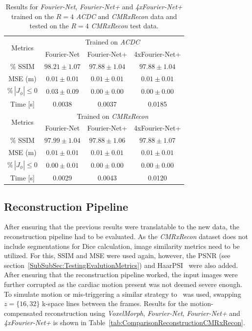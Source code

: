 \documentclass[english,version-2022-01]{uzl-thesis} %
\begin{document}
\begin{table}[H] %
	\centering
	\caption{Results for \emph{Fourier-Net}, \emph{Fourier-Net+} and \emph{4xFourier-Net+} trained on the $R=4$ \emph{ACDC} and \emph{CMRxRecon} data and tested on the $R=4$ \emph{CMRxRecon} test data.}
	\label{tab:DomainTranslation_ACDC_CMRxRecon}
	\begin{tabular}{c c c c} %
		\toprule
		\multirow{2}{*}{Metrics} & \multicolumn{3}{c}{Trained on \emph{ACDC}} \\
		\cline{2-4} 
		 & Fourier-Net & Fourier-Net+ & 4xFourier-Net+\\	
		\midrule
		$\%$ SSIM & $98.21 \pm 1.07$ & $97.88 \pm 1.04$ & $97.88 \pm 1.04$\\
		MSE (m) & $0.01 \pm 0.01$ & $0.01 \pm 0.01$ & $0.01 \pm 0.01$ \\
		$\% \, |J_{\phi}|\leq0$ & $0.03 \pm 0.09$ & $0.00 \pm 0.00$ & $0.00 \pm 0.00$ \\
		Time [s] 	  & 0.0038 & 0.0037 & 0.0185  \\
		\midrule
		\multirow{2}{*}{Metrics} & \multicolumn{3}{c}{Trained on \emph{CMRxRecon}} \\
		\cline{2-4} 
		 & Fourier-Net & Fourier-Net+ & 4xFourier-Net+\\		
		\midrule
		$\%$ SSIM & $97.99 \pm 1.04$ & $97.88 \pm 1.06$ & $97.88 \pm 1.07$\\
		MSE (m) & $0.01 \pm 0.01$ & $0.01 \pm 0.01$ & $0.01 \pm 0.01$ \\
		$\% \, |J_{\phi}|\leq0$ & $0.00 \pm 0.01$ & $0.00 \pm 0.00$ & $0.00 \pm 0.00$ \\
		Time [s] 	  & 0.0029 & 0.0043 & 0.0120  \\
		\bottomrule
	\end{tabular}	
\end{table}

\subsection{Reconstruction Pipeline} \label{SubSec:ResultsReconstructionPipeline}
After ensuring that the previous results were translatable to the new data, the reconstruction pipeline had to be evaluated. As the \emph{CMRxRecon} dataset does not include segmentations for Dice calculation, image similarity metrics need to be utilized. For this, SSIM and MSE were used again, however, the PSNR (see section~\ref{SubSubSec:TestingEvalutionMetrics}) and HaarPSI~\cite{HaarPSI} were also added. After ensuring that the reconstruction pipeline worked, the input images were further corrupted as the cardiac motion present was not deemed severe enough. To simulate motion or mis-triggering a similar strategy to~\cite{Oksuz2020} was used, swapping $z=\{16,32\}$ k-space lines between the frames. Results for the motion-compensated reconstruction using \emph{VoxelMorph}, \emph{Fourier-Net}, \emph{Fourier-Net+} and \emph{4xFourier-Net+} is shown in Table~\ref{tab:ComparisonReconstructionCMRxRecon}.
\end{document}
